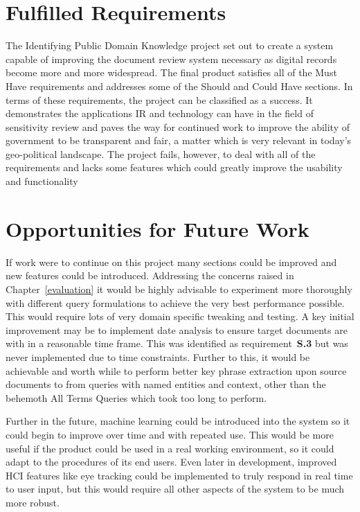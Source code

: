 \documentclass{l4proj}
\begin{document}
\section{Fulfilled Requirements}
The Identifying Public Domain Knowledge project set out to create a system capable of improving the document review system necessary as digital records become more and more widespread.
The final product satisfies all of the Must Have requirements and addresses some of the Should and Could Have sections. In terms of these requirements, the project can be classified as a success.
It demonstrates the applications IR and technology can have in the field of sensitivity review and paves the way for continued work to improve the ability of government to be transparent and fair, a matter which is very relevant in today's geo-political landscape. The project fails, however, to deal with all of the requirements and lacks some features which could greatly improve the usability and functionality

\section{Opportunities for Future Work}
If work were to continue on this project many sections could be improved and new features could be introduced. Addressing the concerns raised in Chapter~\ref{evaluation} it would be highly advisable to experiment more thoroughly with different query formulations to achieve the very best performance possible. This would require lots of very domain specific tweaking and testing. A key initial improvement may be to implement date analysis to ensure target documents are with in a reasonable time frame. This was identified as requirement~\textbf{S.3} but was never implemented due to time constraints.
Further to this, it would be achievable and worth while to perform better key phrase extraction upon source documents to from queries with named entities and context, other than the behemoth All Terms Queries which took too long to perform.

Further in the future, machine learning could be introduced into the system so it could begin to improve over time and with repeated use. This would be more useful if the product could be used in a real working environment, so it could adapt to the procedures of its end users.
Even later in development, improved HCI features like eye tracking could be implemented to truly respond in real time to user input, but this would require all other aspects of the system to be much more robust.
\end{document}
